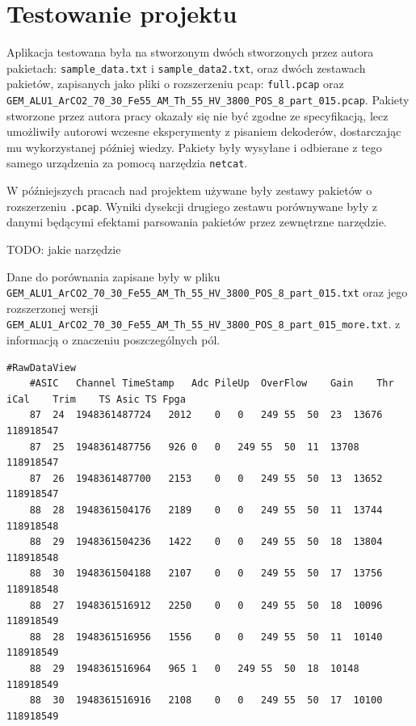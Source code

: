 \documentclass[a4paper, 12pt, twoside, openright]{article}
\begin{document}
\newpage
\section{Testowanie projektu}

	Aplikacja testowana była na stworzonym dwóch stworzonych przez autora pakietach: \texttt{sample\_data.txt}
	i \texttt{sample\_data2.txt}, oraz dwóch zestawach pakietów, zapisanych jako pliki o rozszerzeniu pcap:
	\texttt{full.pcap} oraz \texttt{GEM\_ALU1\_ArCO2\_70\_30\_Fe55\_AM\_Th\_55\_HV\_3800\_POS\_8\_part\_015.pcap}.
	Pakiety stworzone przez autora pracy okazały się nie być zgodne ze specyfikacją, lecz umożliwiły autorowi
	wczesne eksperymenty z pisaniem dekoderów, dostarczając mu wykorzystanej później wiedzy. Pakiety były wysyłane
	i odbierane z tego samego urządzenia za pomocą narzędzia \texttt{netcat}.

	W późniejszych pracach nad projektem używane były zestawy pakietów o rozszerzeniu \texttt{.pcap}.
	Wyniki dysekcji drugiego zestawu porównywane były z danymi będącymi efektami parsowania pakietów
	przez zewnętrzne narzędzie.

	TODO: jakie narzędzie

	Dane do porównania zapisane były w pliku \texttt{GEM\_ALU1\_ArCO2\_70\_30\_Fe55\_AM\_Th\_55\_HV\_3800\_POS\_8\_part\_015.txt} oraz
	jego rozszerzonej wersji \texttt{GEM\_ALU1\_ArCO2\_70\_30\_Fe55\_AM\_Th\_55\_HV\_3800\_POS\_8\_part\_015\_more.txt}.
	z informacją o znaczeniu poszczególnych pól.

	\begin{minipage}{\linewidth}
	\begin{lstlisting}[style=CStyle,caption={Zawartość pliku *more.txt}]
	#RawDataView
	#ASIC	Channel	TimeStamp	Adc	PileUp	OverFlow	Gain	Thr	iCal	Trim	TS Asic	TS Fpga
	87	24	1948361487724	2012	0	0	249	55	50	23	13676	118918547
	87	25	1948361487756	926	0	0	249	55	50	11	13708	118918547
	87	26	1948361487700	2153	0	0	249	55	50	13	13652	118918547
	88	28	1948361504176	2189	0	0	249	55	50	11	13744	118918548
	88	29	1948361504236	1422	0	0	249	55	50	18	13804	118918548
	88	30	1948361504188	2107	0	0	249	55	50	17	13756	118918548
	88	27	1948361516912	2250	0	0	249	55	50	18	10096	118918549
	88	28	1948361516956	1556	0	0	249	55	50	11	10140	118918549
	88	29	1948361516964	965	1	0	249	55	50	18	10148	118918549
	88	30	1948361516916	2108	0	0	249	55	50	17	10100	118918549
	\end{lstlisting}
	\end{minipage}
\end{document}
